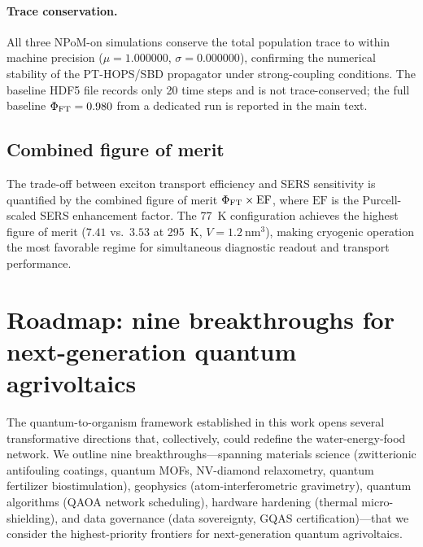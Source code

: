 \documentclass[11pt,a4paper]{article}
\begin{document}
\paragraph{Trace conservation.}
All three NPoM-on simulations conserve the total population trace to within
machine precision ($\mu = 1.000000$, $\sigma = 0.000000$), confirming the
numerical stability of the PT-HOPS/SBD propagator under strong-coupling
conditions.
The baseline HDF5 file records only 20 time steps and is not
trace-conserved; the full baseline $\Phi_{\rm FT} = 0.980$ from a dedicated
run is reported in the main text.

\subsection{Combined figure of merit}

The trade-off between exciton transport efficiency and SERS sensitivity is
quantified by the combined figure of merit $\Phi_{\rm FT} \times \mathrm{EF}$,
where $\mathrm{EF}$ is the Purcell-scaled SERS enhancement factor.
The \qty{77}{\kelvin} configuration achieves the highest figure of merit
($7.41$ vs.~$3.53$ at \qty{295}{\kelvin}, $V = \qty{1.2}{\nm\cubed}$),
making cryogenic operation the most favorable regime for simultaneous
diagnostic readout and transport performance.



\section{Roadmap: nine breakthroughs for next-generation quantum agrivoltaics}
\label{SI-sec:roadmap}

The quantum-to-organism framework established in this work opens several
transformative directions that, collectively, could redefine the
water-energy-food network. We outline nine breakthroughs---spanning materials
science (zwitterionic antifouling coatings, quantum MOFs, NV-diamond relaxometry,
quantum fertilizer biostimulation), geophysics (atom-interferometric gravimetry),
quantum algorithms (QAOA network scheduling), hardware hardening (thermal
micro-shielding), and data governance (data sovereignty, GQAS certification)---that
we consider the highest-priority frontiers for next-generation quantum agrivoltaics.
\end{document}
